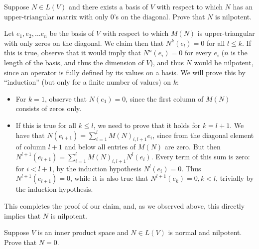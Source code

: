  \begin{exercise}{12}
     Suppose $N \in L(V)$ and there exists a basis of $V$ with respect to which $N$ has an upper-triangular matrix with only 0's on the diagonal. Prove that $N$ is nilpotent.
 \end{exercise}

\begin{solution}

    Let $e_1, e_2, \ldots e_n$ be the basis of $V$ with respect to which $M(N)$ is upper-triangular with only zeros on the diagonal. We claim then that $N^k(e_l) = 0$ for all $l \leq k$. If this is true, observe that it would imply that $N^{n}(e_i) = 0$ for every $e_i$ ($n$ is the length of the basis, and thus the dimension of $V$), and thus $N$ would be nilpotent, since an operator is fully defined by its values on a basis. We will prove this by ``induction'' (but only for a finite number of values) on $k$:
    \begin{itemize}
        \item For $k=1$, observe that $N(e_1) = 0$, since the first column of $M(N)$ consists of zeros only.
        \item If this is true for all $k \leq l$, we need to prove that it holds for $k = l+1$. We have that $N(e_{l+1}) = \sum_{i=1}^{l} M(N)_{i, l+1}e_{i}$, since from the diagonal element of column $l+1$ and below all entries of $M(N)$ are zero. But then $N^{l+1}(e_{l+1}) = \sum_{i=1}^{l}M(N)_{i, l+1}N^{l}(e_i)$. Every term of this sum is zero: for $i < l+1$, by the induction hypothesis $N^{l}(e_i) = 0$. Thus $N^{l+1}(e_{l+1}) = 0$, while it is also true that $N^{l+1}(e_k) = 0, k < l$, trivially by the induction hypothesis.
    \end{itemize}
    This completes the proof of our claim, and, as we observed above, this directly implies that $N$ is nilpotent.
\end{solution}

\begin{exercise}{13}
    Suppose $V$ is an inner product space and $N \in L(V)$ is normal and nilpotent. Prove that $N=0$.
\end{exercise}

